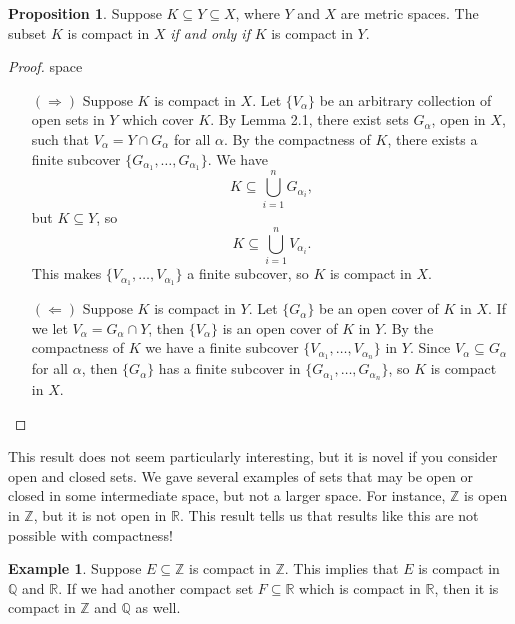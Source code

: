 \documentclass{article}
\newcommand{\R}{\mathbb{R}}
\newcommand{\Q}{\mathbb{Q}}
\newcommand{\Z}{\mathbb{Z}}
\theoremstyle{definition}
\newtheorem{proposition}{Proposition}[section]
\newtheorem{example}{Example}[section]
\begin{document}
\begin{proposition}
	Suppose $ K\subseteq Y\subseteq X $, where $ Y $ and $ X $ are metric spaces. The subset $ K $ is compact in $ X $ \textit{if and only if} $ K $ is compact in $ Y $.  
\end{proposition}
\begin{proof}{\color{white}space}
	\begin{enumerate}
		\item[$ (\Longrightarrow) $] Suppose $ K $ is compact in $ X $. Let $ \{V_\alpha\} $ be an arbitrary collection of open sets in $ Y $ which cover $ K $. By Lemma 2.1, there exist sets $ G_\alpha $, open in $ X $, such that $ V_\alpha=Y\cap G_\alpha $ for all $ \alpha $. By the compactness of $ K $, there exists a finite subcover $ \{G_{\alpha_1},\ldots,G_{\alpha_1}\} $. We have $$ K\subseteq\bigcup_{i=1}^n G_{\alpha_i} ,$$ but $ K\subseteq Y $, so $$ K\subseteq\bigcup_{i=1}^n V_{\alpha_i} . $$ This makes $ \{V_{\alpha_1},\ldots,V_{\alpha_1}\} $ a finite subcover, so $ K $ is compact in $ X $. 
		\item[$ (\Longleftarrow) $] Suppose $ K $ is compact in $ Y $. Let $ \{G_\alpha\} $ be an open cover of $ K $ in $ X $. If we let $ V_\alpha=G_\alpha\cap Y $, then $ \{V_\alpha\} $ is an open cover of $ K $ in $ Y $. By the compactness of $ K $ we have a finite subcover $ \{V_{\alpha_1},\ldots,V_{\alpha_n}\} $ in $ Y $. Since $ V_\alpha\subseteq G_\alpha $ for all $ \alpha $, then $ \{G_\alpha\} $ has a finite subcover in $ \{G_{\alpha_1},\ldots,G_{\alpha_n}\} $, so $ K $ is compact in $ X $. 
	\end{enumerate}
	
\end{proof}
This result does not seem particularly interesting, but it is novel if you consider open and closed sets. We gave several examples of sets that may be open or closed in some intermediate space, but not a larger space. For instance, $ \Z $ is open in $ \Z $, but it is not open in $ \R $. This result tells us that results like this are not possible with compactness!
\begin{example}
	Suppose $ E\subseteq \Z $ is compact in $ \Z $. This implies that $ E $ is compact in $ \Q $ and $ \R $. If we had another compact set $ F\subseteq\R $ which is compact in $ \R $, then it is compact in $ \Z $ and $ \Q $ as well. 
\end{example}
\end{document}
